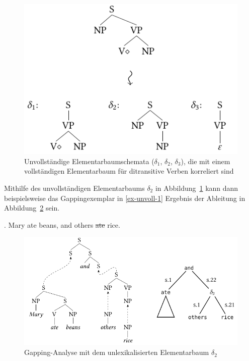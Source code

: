 \begin{figure}[t]
\centering
\includegraphics[angle=90]{graphics/abb830.pdf}
\caption{\label{fig-tag-unvoll-1}Unvollständige Elementarbaumschemata ($\delta_1$, $\delta_2$, $\delta_3$), die mit einem vollständigen Elementarbaum für ditransitive Verben korreliert sind}
\end{figure}

Mithilfe des unvollständigen Elementarbaums $\delta_2$ in Abbildung~\ref{fig-tag-unvoll-1} kann dann beispielsweise das Gappingexemplar in \ref{ex-unvoll-1} Ergebnis der Ableitung in Abbildung~\ref{fig-tag-unvoll-2} sein.

\ex. \label{ex-unvoll-1} Mary ate beans, and others \sout{ate} rice. %

\begin{figure}[t] 
\centering
\includegraphics{graphics/abb831.pdf}
\caption{\label{fig-tag-unvoll-2}Gapping-Analyse mit dem unlexikalisierten Elementarbaum $\delta_2$}
\end{figure} 

